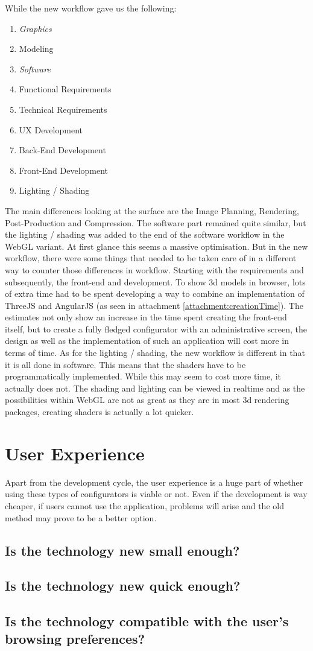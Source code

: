 While the new workflow gave us the following:
\begin{enumerate}
	\item {\textit{Graphics}}
	\item {Modeling}
	\item {\textit{Software}}
	\item {Functional Requirements}
	\item {Technical Requirements}
	\item {UX Development}
	\item {Back-End Development}
	\item {Front-End Development}
	\item {Lighting / Shading}
\end{enumerate}

The main differences looking at the surface are the Image Planning, Rendering, Post-Production and Compression. The software part remained quite similar, but the lighting / shading was added to the end of the software workflow in the WebGL variant. At first glance this seems a massive optimisation. But in the new workflow, there were some things that needed to be taken care of in a different way to counter those differences in workflow. Starting with the requirements and subsequently, the front-end and development. To show 3d models in browser, lots of extra time had to be spent developing a way to combine an implementation of ThreeJS and AngularJS (as seen in attachment \ref{attachment:creationTime}). The estimates not only show an increase in the time spent creating the front-end itself, but to create a fully fledged configurator with an administrative screen, the design as well as the implementation of such an application will cost more in terms of time.\newline
As for the lighting / shading, the new workflow is different in that it is all done in software. This means that the shaders have to be programmatically implemented. While this may seem to cost more time, it actually does not. The shading and lighting can be viewed in realtime and as the possibilities within WebGL are not as great as they are in most 3d rendering packages, creating shaders is actually a lot quicker.

\section{User Experience}
Apart from the development cycle, the user experience is a huge part of whether using these types of configurators is viable or not. Even if the development is way cheaper, if users cannot use the application, problems will arise and the old method may prove to be a better option.

\subsection {Is the technology new small enough?}
\subsection {Is the technology new quick enough?}
\subsection {Is the technology compatible with the user's browsing preferences?}
